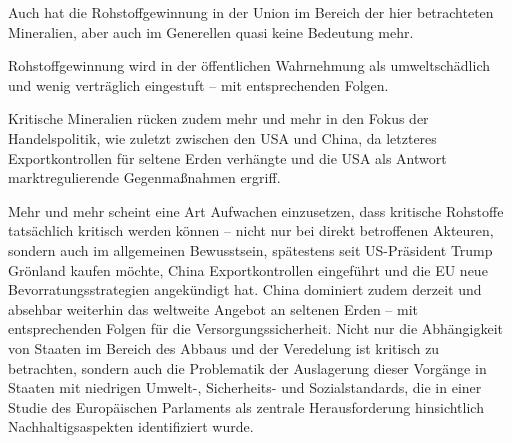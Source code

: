 \documentclass[12pt,a4paper,oneside]{book} %
\begin{document}
	Auch hat die Rohstoffgewinnung in der Union im Bereich der hier betrachteten Mineralien, aber auch im Generellen quasi keine Bedeutung mehr.
	
	Rohstoffgewinnung wird in der öffentlichen Wahrnehmung als umweltschädlich und wenig verträglich eingestuft -- mit entsprechenden Folgen.
	
	Kritische Mineralien rücken zudem mehr und mehr in den Fokus der Handelspolitik, wie zuletzt zwischen den USA und China, da letzteres Exportkontrollen für seltene Erden verhängte und die USA als Antwort marktregulierende Gegenmaßnahmen ergriff.
	
	Mehr und mehr scheint eine Art Aufwachen einzusetzen, dass kritische Rohstoffe tatsächlich kritisch werden können -- nicht nur bei direkt betroffenen Akteuren, sondern auch im allgemeinen Bewusstsein, spätestens seit US-Präsident Trump Grönland kaufen möchte, China Exportkontrollen eingeführt und die EU neue Bevorratungsstrategien angekündigt hat. China dominiert zudem derzeit und absehbar weiterhin das weltweite Angebot an seltenen Erden -- mit entsprechenden Folgen für die Versorgungssicherheit. Nicht nur die Abhängigkeit von Staaten im Bereich des Abbaus und der Veredelung ist kritisch zu betrachten, sondern auch die Problematik der Auslagerung dieser Vorgänge in Staaten mit niedrigen Umwelt-, Sicherheits- und Sozialstandards,\autocite[siehe hierzu]{ÖAW Artikel} die in einer Studie des Europäischen Parlaments als zentrale Herausforderung hinsichtlich Nachhaltigsaspekten identifiziert wurde.\autocite[16]{The role of research and innovation in ensuring a safe and sustainable supply of critical raw materials in the EU}
	
	
	
\end{document}
